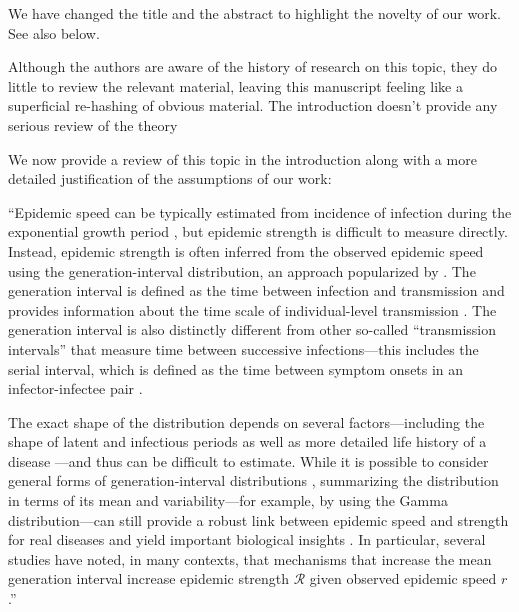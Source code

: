 \documentclass[12pt]{article}
\newcommand{\RR}{\ensuremath{{\mathcal R}}\xspace}
\newcommand{\revtext}{\textsf}
\begin{document}
We have changed the title and the abstract to highlight the novelty of our work. 
See also below.

\revtext{Although the authors are aware of the history of research on this topic, they do little to review the relevant material, leaving this manuscript feeling like a superficial re-hashing of obvious material.  The introduction doesn't provide any serious review of the theory}

We now provide a review of this topic in the introduction along with a more detailed justification of the assumptions of our work:

``Epidemic speed can be typically estimated from incidence of infection during the exponential growth period \citep{mills2004transmissibility,nishiura2009transmission,ma2014estimating}, but epidemic strength is difficult to measure directly.
Instead, epidemic strength is often inferred from the observed epidemic speed using the generation-interval distribution, an approach popularized by \citep{wallinga2007generation}.
The generation interval is defined as the time between infection and transmission and provides information about the time scale of individual-level transmission \citep{svensson2007note}.
The generation interval is also distinctly different from other so-called ``transmission intervals'' that measure time between successive infections---this includes the serial interval, which is defined as the time between symptom onsets in an infector-infectee pair \citep{fine2003interval,grassly2008mathematical,britton2019estimation,ali2020serial,park2021forward}.

The exact shape of the distribution depends on several factors---including the shape of latent and infectious periods \citep{lloyd2001realistic,wearing2005appropriate,roberts2007model} as well as more detailed life history of a disease \citep{huber2016quantitative}---and thus can be difficult to estimate.
While it is possible to consider general forms of generation-interval distributions \citep{miller2010epidemics,svensson2015influence}, summarizing the distribution in terms of its mean and variability---for example, by using the Gamma distribution---can still provide a robust link between epidemic speed and strength for real diseases and yield important biological insights \citep{park2019practical}.
In particular, several studies have noted, in many contexts, that mechanisms that increase the mean generation interval increase epidemic strength $\RR$ given observed epidemic speed $r$ \citep{eaton2014proportion,powers2014impact,weitz2015modeling,park2020time}.''
\end{document}
